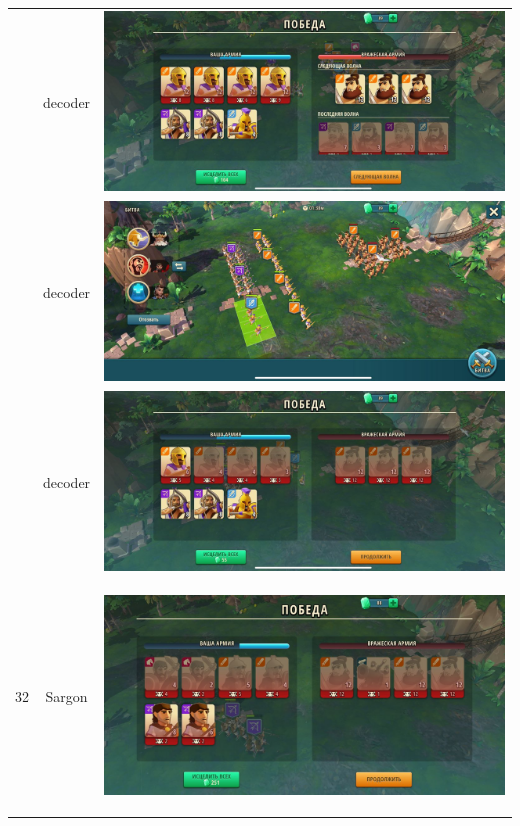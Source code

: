 \begin{longtable}{|c|c|c|}
	& decoder &
	\includegraphics[width=0.75\linewidth]{./parts/media/TreasureHunt/31/decoder/photo_2022-04-07_09-59-58.jpg} \\
	& decoder &
	\includegraphics[width=0.75\linewidth]{./parts/media/TreasureHunt/31/decoder/photo_2022-04-07_10-00-36.jpg} \\
	& decoder &
	\includegraphics[width=0.75\linewidth]{./parts/media/TreasureHunt/31/decoder/photo_2022-04-07_10-00-46.jpg} \\
	\hline
	\multirow{12}{*}{32} & Sargon &
	\hypertarget{fight32}{\includegraphics[width=0.75\linewidth]{./parts/media/TreasureHunt/32/sargon/photo_2022-04-07_10-05-45.jpg}} \\

\end{longtable}
